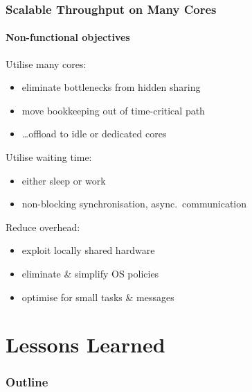 \documentclass[9pt]{beamer}
\begin{document}
\begin{frame}
  \frametitle{Scalable Throughput on Many Cores }
  \framesubtitle{Non-functional objectives}

  \begin{block}{Utilise many cores:}
    \begin{itemize}
    \item eliminate bottlenecks from hidden sharing %
    \item move bookkeeping out of time-critical path %
    \item \ldots offload to idle or dedicated cores %
    \end{itemize}
  \end{block}

  \begin{block}{Utilise waiting time:}
    \begin{itemize}
    \item either sleep or work %
    \item non-blocking synchronisation, async.\ communication
    \end{itemize}
  \end{block}

  \begin{block}{Reduce overhead:}
    \begin{itemize}
    \item exploit locally shared hardware %
    \item eliminate \& simplify OS policies %
    \item optimise for small tasks \& messages %
    \end{itemize}
  \end{block}
\end{frame}

\section{Lessons Learned}

\begin{frame}
  \frametitle{Outline}
  \tableofcontents[currentsection]
\end{frame}
\end{document}
